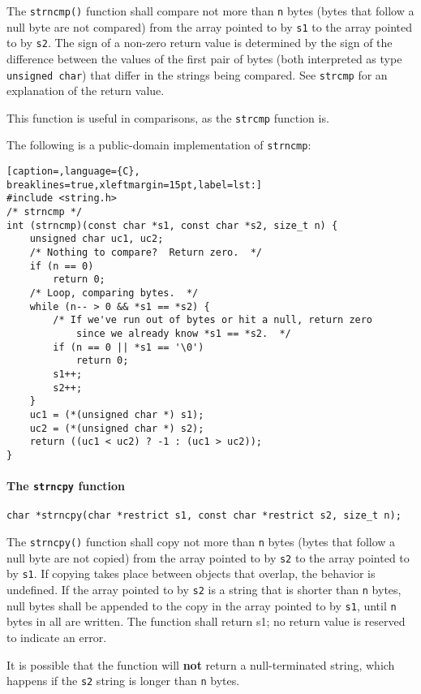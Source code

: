The \texttt{strncmp()} function shall compare not more than \texttt{n} bytes
(bytes that follow a null byte are not compared) from the array pointed to by
\texttt{s1} to the array pointed to by \texttt{s2}. The sign of a non-zero
return value is determined by the sign of the difference between the values of
the first pair of bytes (both interpreted as type \texttt{unsigned char}) that
differ in the strings being compared. See \texttt{strcmp} for an explanation of
the return value.

This function is useful in comparisons, as the \texttt{strcmp} function is.

The following is a public-domain implementation of \texttt{strncmp}:

\lstset{basicstyle=\scriptsize, numbers=left, captionpos=b, tabsize=4}
\begin{lstlisting}[caption=,language={C},
breaklines=true,xleftmargin=15pt,label=lst:]
#include <string.h>
/* strncmp */
int (strncmp)(const char *s1, const char *s2, size_t n) {
	unsigned char uc1, uc2;
	/* Nothing to compare?  Return zero.  */
	if (n == 0)
		return 0;
	/* Loop, comparing bytes.  */
	while (n-- > 0 && *s1 == *s2) {
	    /* If we've run out of bytes or hit a null, return zero
	        since we already know *s1 == *s2.  */
	    if (n == 0 || *s1 == '\0')
	      	return 0;
	    s1++;
	    s2++;
	}
	uc1 = (*(unsigned char *) s1);
	uc2 = (*(unsigned char *) s2);
	return ((uc1 < uc2) ? -1 : (uc1 > uc2));
}
\end{lstlisting}

\paragraph{The \texttt{strncpy} function}
\texttt{char *strncpy(char *restrict s1, const char *restrict s2, size\_t n);}

The \texttt{strncpy()} function shall copy not more than \texttt{n} bytes
(bytes that follow a null byte are not copied) from the array pointed to by
\texttt{s2} to the array pointed to by \texttt{s1}. If copying takes place
between objects that overlap, the behavior is undefined. If the array pointed
to by \texttt{s2} is a string that is shorter than \texttt{n} bytes, null bytes
shall be appended to the copy in the array pointed to by \texttt{s1}, until
\texttt{n} bytes in all are written. The function shall return s1; no return
value is reserved to indicate an error.

It is possible that the function will \textbf{not} return a null-terminated
string, which happens if the \texttt{s2} string is longer than \texttt{n}
bytes.


